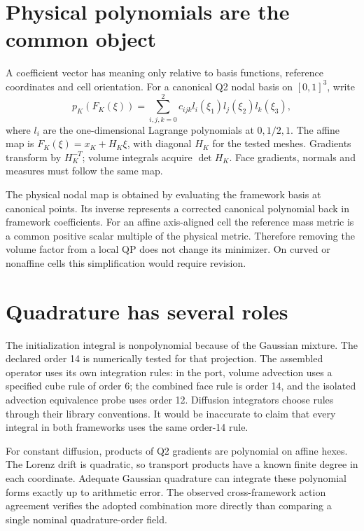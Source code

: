 \section{Physical polynomials are the common object}
A coefficient vector has meaning only relative to basis functions, reference coordinates and cell orientation. For a canonical Q2 nodal basis on $[0,1]^3$, write
\begin{equation}
 p_K(F_K(\xi))=\sum_{i,j,k=0}^{2}c_{ijk}l_i(\xi_1)l_j(\xi_2)l_k(\xi_3),
\end{equation}
where $l_i$ are the one-dimensional Lagrange polynomials at $0,1/2,1$. The affine map is $F_K(\xi)=x_K+H_K\xi$, with diagonal $H_K$ for the tested meshes. Gradients transform by $H_K^{-T}$; volume integrals acquire $\det H_K$. Face gradients, normals and measures must follow the same map.

The physical nodal map is obtained by evaluating the framework basis at canonical points. Its inverse represents a corrected canonical polynomial back in framework coefficients. For an affine axis-aligned cell the reference mass metric is a common positive scalar multiple of the physical metric. Therefore removing the volume factor from a local QP does not change its minimizer. On curved or nonaffine cells this simplification would require revision.

\section{Quadrature has several roles}
The initialization integral is nonpolynomial because of the Gaussian mixture. The declared order 14 is numerically tested for that projection. The assembled operator uses its own integration rules: in the port, volume advection uses a specified cube rule of order 6; the combined face rule is order 14, and the isolated advection equivalence probe uses order 12. Diffusion integrators choose rules through their library conventions. It would be inaccurate to claim that every integral in both frameworks uses the same order-14 rule.

For constant diffusion, products of Q2 gradients are polynomial on affine hexes. The Lorenz drift is quadratic, so transport products have a known finite degree in each coordinate. Adequate Gaussian quadrature can integrate these polynomial forms exactly up to arithmetic error. The observed cross-framework action agreement verifies the adopted combination more directly than comparing a single nominal quadrature-order field.


